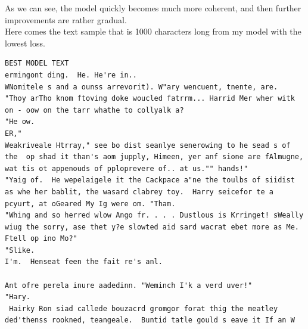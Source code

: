 \documentclass[11pt,a4paper]{article}
\begin{document}
As we can see, the model quickly becomes much more coherent, and then further improvements are rather gradual.\\

Here comes the text sample that is 1000 characters long from my model with the lowest loss.

\begin{verbatim}
BEST MODEL TEXT
ermingont ding.  He. He're in..
WNomitele s and a ounss arrevorit). W"ary wencuent, tnente, are.
"Thoy arTho knom ftoving doke woucled fatrrm... Harrid Mer wher witk on - oow on the tarr whathe to collyalk a?
"He ow. 
ER,"
Weakriveale Htrray," see bo dist seanlye senerowing to he sead s of the  op shad it than's aom jupply, Himeen, yer anf sione are fAlmugne, wat tis ot appenouds of pploprevere of.. at us."" hands!"
"Yaig of.  He wepelaigele it the Cackpace a"ne the toulbs of siidist as whe her bablit, the wasard clabrey toy.  Harry seicefor te a pcyurt, at oGeared My Ig were om. "Tham. 
"Whing and so herred wlow Ango fr. . . . Dustlous is Krringet! sWeally wiug the sorry, ase thet y?e slowted aid sard wacrat ebet more as Me. Ftell op ino Mo?"
"Slike.
I'm.  Henseat feen the fait re's anl.

Ant ofre perela inure aadedinn. "Weminch I'k a verd uver!"
"Hary.
 Hairky Ron siad callede bouzacrd gromgor forat thig the meatley ded'thenss rookned, teangeale.  Buntid tatle gould s eave it If an W
 
\end{verbatim}
\end{document}
